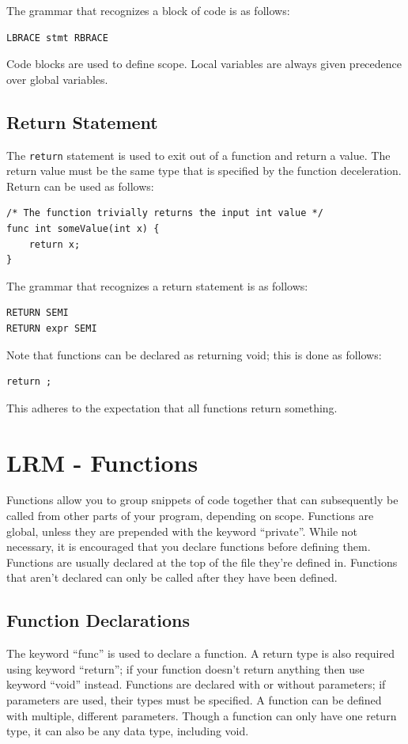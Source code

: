 \documentclass{article}
\begin{document}
The grammar that recognizes a block of code is as follows:
\begin{Verbatim}[frame=single]
LBRACE stmt RBRACE
\end{Verbatim}

Code blocks are used to define scope. Local variables are always given precedence over global variables. 

\subsection{Return Statement}
The \texttt{return} statement is used to exit out of a function and return a value.  The return value must be the same type that is specified by the function deceleration.  Return can be used as follows:

\begin{lstlisting}
/* The function trivially returns the input int value */
func int someValue(int x) {
	return x;
}
\end{lstlisting}

The grammar that recognizes a return statement is as follows:
\begin{Verbatim}[frame=single]
RETURN SEMI
RETURN expr SEMI
\end{Verbatim}

Note that functions can be declared as returning void; this is done as follows: 
\begin{lstlisting}
return ;
\end{lstlisting}
This adheres to the expectation that all functions return something.

\section{LRM - Functions}
Functions allow you to group snippets of code together that can subsequently be called from other parts of your program, depending on scope. Functions are global, unless they are prepended with the keyword ``private''. While not necessary, it is encouraged that you declare functions before defining them. Functions are usually declared at the top of the file they're defined in. Functions that aren't declared can only be called after they have been defined. 

\subsection{Function Declarations}

The keyword ``func'' is used to declare a function. A return type is also required using keyword ``return''; if your function doesn't return anything then use keyword ``void'' instead.  Functions are declared with or without parameters; if parameters are used, their types must be specified. A function can be defined with multiple, different parameters. Though a function can only have one return type, it can also be any data type, including void.
\end{document}

